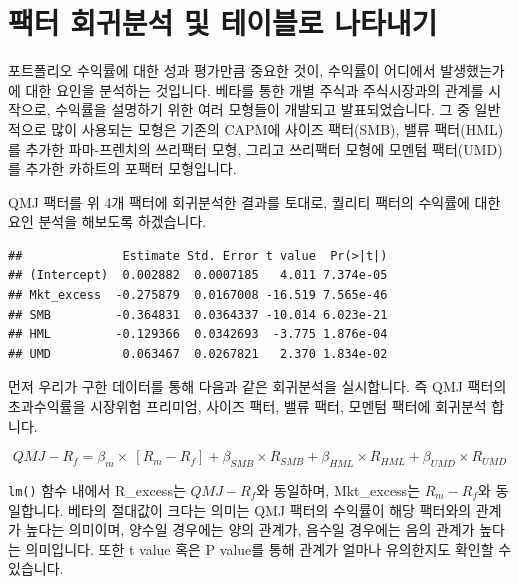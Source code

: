 \documentclass[12pt,]{book}
\newenvironment{Shaded}{\begin{snugshade}}{\end{snugshade}}
\newcommand{\CommentTok}[1]{\textcolor[rgb]{0.56,0.35,0.01}{\textit{#1}}}
\newcommand{\DataTypeTok}[1]{\textcolor[rgb]{0.13,0.29,0.53}{#1}}
\newcommand{\KeywordTok}[1]{\textcolor[rgb]{0.13,0.29,0.53}{\textbf{#1}}}
\newcommand{\NormalTok}[1]{#1}
\newcommand{\OperatorTok}[1]{\textcolor[rgb]{0.81,0.36,0.00}{\textbf{#1}}}
\newcommand{\StringTok}[1]{\textcolor[rgb]{0.31,0.60,0.02}{#1}}
\begin{document}
\hypertarget{section-91}{%
\section{팩터 회귀분석 및 테이블로 나타내기}\label{section-91}}

포트폴리오 수익률에 대한 성과 평가만큼 중요한 것이, 수익률이 어디에서 발생했는가에 대한 요인을 분석하는 것입니다. 베타를 통한 개별 주식과 주식시장과의 관계를 시작으로, 수익률을 설명하기 위한 여러 모형들이 개발되고 발표되었습니다. 그 중 일반적으로 많이 사용되는 모형은 기존의 CAPM에 사이즈 팩터(SMB), 밸류 팩터(HML)를 추가한 파마-프렌치의 쓰리팩터 모형, 그리고 쓰리팩터 모형에 모멘텀 팩터(UMD)를 추가한 카하트의 포팩터 모형입니다.

QMJ 팩터를 위 4개 팩터에 회귀분석한 결과를 토대로, 퀄리티 팩터의 수익률에 대한 요인 분석을 해보도록 하겠습니다.

\begin{Shaded}
\end{Shaded}

\begin{verbatim}
##              Estimate Std. Error t value  Pr(>|t|)
## (Intercept)  0.002882  0.0007185   4.011 7.374e-05
## Mkt_excess  -0.275879  0.0167008 -16.519 7.565e-46
## SMB         -0.364831  0.0364337 -10.014 6.023e-21
## HML         -0.129366  0.0342693  -3.775 1.876e-04
## UMD          0.063467  0.0267821   2.370 1.834e-02
\end{verbatim}

먼저 우리가 구한 데이터를 통해 다음과 같은 회귀분석을 실시합니다. 즉 QMJ 팩터의 초과수익률을 시장위험 프리미엄, 사이즈 팩터, 밸류 팩터, 모멘텀 팩터에 회귀분석 합니다.

\[QMJ - R_f= \beta_m \times \ [R_m - R_f] + \beta_{SMB} \times R_{SMB} + \beta_{HML} \times R_{HML} + \beta_{UMD} \times R_{UMD}\]

\texttt{lm()} 함수 내에서 R\_excess는 \(QMJ - R_f\)와 동일하며, Mkt\_excess는 \(R_m - R_f\)와 동일합니다. 베타의 절대값이 크다는 의미는 QMJ 팩터의 수익률이 해당 팩터와의 관계가 높다는 의미이며, 양수일 경우에는 양의 관계가, 음수일 경우에는 음의 관계가 높다는 의미입니다. 또한 t value 혹은 P value를 통해 관계가 얼마나 유의한지도 확인할 수 있습니다.
\end{document}
